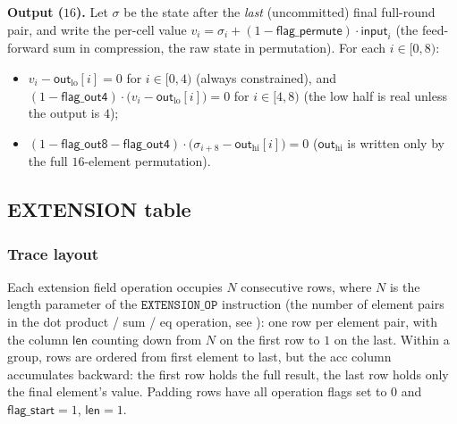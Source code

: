 \documentclass{article}
\theoremstyle{definition}
\begin{document}
\textbf{Output ($16$).} Let $\sigma$ be the state after the \emph{last} (uncommitted) final full-round pair, and write the per-cell value $v_i = \sigma_i + (1 - \textsf{flag\_permute}) \cdot \textsf{input}_i$ (the feed-forward sum in compression, the raw state in permutation). For each $i \in [0, 8)$:
\begin{itemize}
    \item $v_i - \textsf{out}_\text{lo}[i] = 0$ \quad for $i \in [0, 4)$ (always constrained), and $(1 - \textsf{flag\_out4}) \cdot \big(v_i - \textsf{out}_\text{lo}[i]\big) = 0$ \quad for $i \in [4, 8)$ (the low half is real unless the output is $4$);
    \item $(1 - \textsf{flag\_out8} - \textsf{flag\_out4}) \cdot \big(\sigma_{i+8} - \textsf{out}_\text{hi}[i]\big) = 0$ \quad ($\textsf{out}_\text{hi}$ is written only by the full $16$-element permutation).
\end{itemize}


\subsection{EXTENSION table}

\subsubsection{Trace layout}

Each extension field operation occupies $N$ consecutive rows, where $N$ is the length parameter of the $\texttt{EXTENSION\_OP}$ instruction (the number of element pairs in the dot product / sum / eq operation, see ): one row per element pair, with the column $\textsf{len}$ counting down from $N$ on the first row to $1$ on the last. Within a group, rows are ordered from first element to last, but the \textsf{acc} column accumulates backward: the first row holds the full result, the last row holds only the final element's value. Padding rows have all operation flags set to 0 and $\textsf{flag\_start} = 1$, $\textsf{len} = 1$.

\vspace{3mm}
\end{document}

